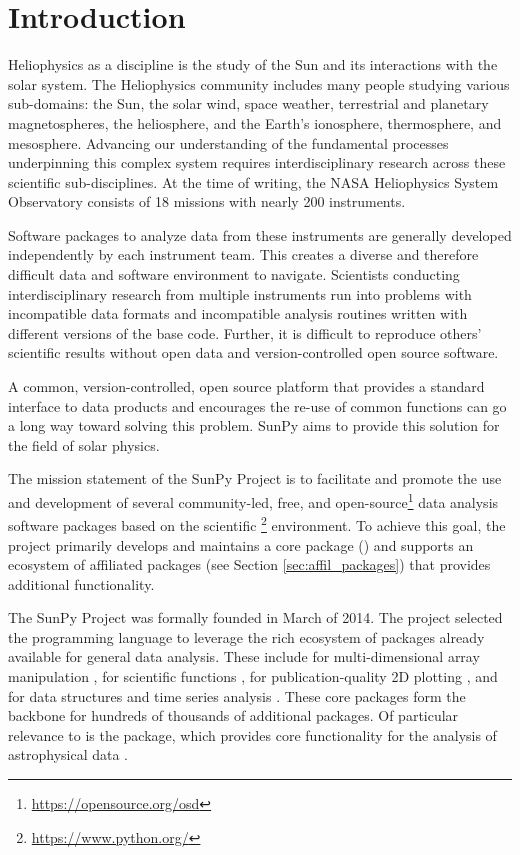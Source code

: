 \section{Introduction}
\label{sec:intro}

Heliophysics as a discipline is the study of the Sun and its interactions with the solar system. 
The Heliophysics community includes many people studying various sub-domains: the Sun, the solar wind, space weather, terrestrial and planetary magnetospheres, the heliosphere, and the Earth's ionosphere, thermosphere, and mesosphere.  
Advancing our understanding of the fundamental processes underpinning this complex system requires interdisciplinary research across these scientific sub-disciplines.
At the time of writing, the NASA Heliophysics System Observatory consists of 18 missions with nearly 200 instruments.

Software packages to analyze data from these instruments are generally developed independently by each instrument team. 
This creates a diverse and therefore difficult data and software environment to navigate. 
Scientists conducting interdisciplinary research from multiple instruments run into problems with incompatible data formats and incompatible analysis routines written with different versions of the base code. Further, it is difficult to reproduce others' scientific results without open data and version-controlled open source software.

A common, version-controlled, open source platform that provides a standard interface to data products and encourages the re-use of common functions can go a long way toward solving this problem. 
SunPy aims to provide this solution for the field of solar physics.

The mission statement of the SunPy Project is to facilitate and promote the use and development of several community-led, free, and open-source\footnote{\url{https://opensource.org/osd}} data analysis software packages based on the scientific \python\footnote{\url{https://www.python.org/}} environment.
To achieve this goal, the project primarily develops and maintains a core package (\sunpypkg) and supports an ecosystem of affiliated packages (see Section \ref{sec:affil_packages}) that provides additional functionality. 

The SunPy Project was formally founded in March of 2014. The project selected the \python programming language to leverage the rich ecosystem of packages already available for general data analysis. 
These include  for multi-dimensional array manipulation \citep{numpy},  for scientific functions \citep{scipy},  for publication-quality 2D plotting \citep{matplotlib}, and  for data structures and time series analysis \citep{pandas}.
These core packages form the backbone for hundreds of thousands of additional \python packages.
Of particular relevance to \sunpypkg is the \astropypkg package, which provides core functionality for the analysis of astrophysical data \citep{astropy2018}. 

